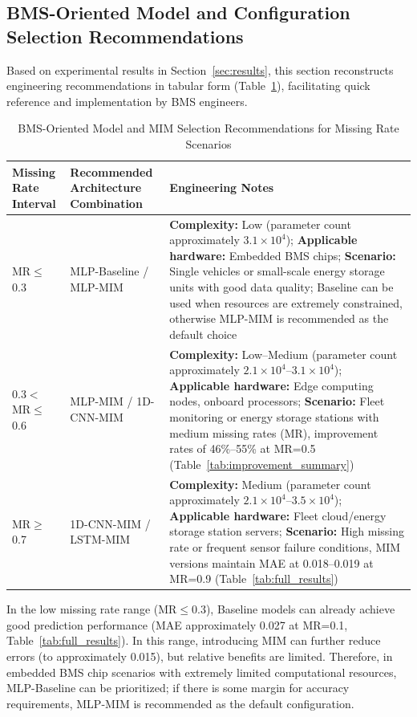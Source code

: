 \documentclass[10pt,a4paper]{article}
\begin{document}
\subsection{BMS-Oriented Model and Configuration Selection Recommendations}

Based on experimental results in Section~\ref{sec:results}, this section reconstructs engineering recommendations in tabular form (Table~\ref{tab:bms_selection}), facilitating quick reference and implementation by BMS engineers.

\begin{table}[H]
\centering
\small
\caption{BMS-Oriented Model and MIM Selection Recommendations for Missing Rate Scenarios}
\label{tab:bms_selection}
\begin{tabular}{@{}p{2.5cm}p{4cm}p{6cm}@{}}
\toprule
\textbf{Missing Rate Interval} & \textbf{Recommended Architecture Combination} & \textbf{Engineering Notes} \\
\midrule
MR$\leq$0.3 & MLP-Baseline / MLP-MIM & \textbf{Complexity:} Low (parameter count approximately $3.1\times10^4$); \textbf{Applicable hardware:} Embedded BMS chips; \textbf{Scenario:} Single vehicles or small-scale energy storage units with good data quality; Baseline can be used when resources are extremely constrained, otherwise MLP-MIM is recommended as the default choice \\
\midrule
0.3$<$MR$\leq$0.6 & MLP-MIM / 1D-CNN-MIM & \textbf{Complexity:} Low--Medium (parameter count approximately $2.1\times10^4$--$3.1\times10^4$); \textbf{Applicable hardware:} Edge computing nodes, onboard processors; \textbf{Scenario:} Fleet monitoring or energy storage stations with medium missing rates (MR), improvement rates of 46\%--55\% at MR=0.5 (Table~\ref{tab:improvement_summary}) \\
\midrule
MR$\geq$0.7 & 1D-CNN-MIM / LSTM-MIM & \textbf{Complexity:} Medium (parameter count approximately $2.1\times10^4$--$3.5\times10^4$); \textbf{Applicable hardware:} Fleet cloud/energy storage station servers; \textbf{Scenario:} High missing rate or frequent sensor failure conditions, MIM versions maintain MAE at 0.018--0.019 at MR=0.9 (Table~\ref{tab:full_results}) \\
\bottomrule
\end{tabular}
\end{table}

In the low missing rate range (MR$\leq$0.3), Baseline models can already achieve good prediction performance (MAE approximately 0.027 at MR=0.1, Table~\ref{tab:full_results}). In this range, introducing MIM can further reduce errors (to approximately 0.015), but relative benefits are limited. Therefore, in embedded BMS chip scenarios with extremely limited computational resources, MLP-Baseline can be prioritized; if there is some margin for accuracy requirements, MLP-MIM is recommended as the default configuration.
\end{document}
